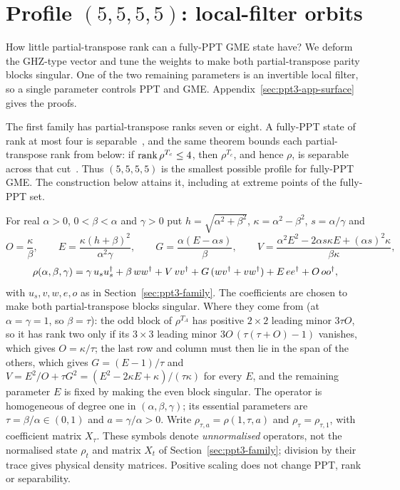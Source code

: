 \section{\texorpdfstring{Profile $(5,5,5,5)$}{Profile (5,5,5,5)}: local-filter orbits}\label{sec:ppt3-surface}

How little partial-transpose rank can a fully-PPT GME state have? We deform the GHZ-type vector and tune the weights to
make both partial-transpose parity blocks singular. One of the two remaining parameters is an invertible local filter,
so a single parameter controls PPT and GME. Appendix~\ref{sec:ppt3-app-surface} gives the proofs.

The first family has partial-transpose ranks seven or eight. A fully-PPT state of rank at most four is
separable~\cite{KCKL,HLVC,KL,ABLS}, and the same theorem bounds each partial-transpose rank from below: if $\operatorname{rank}\rho^{T_c}\le4$, then $\rho^{T_c}$, and hence $\rho$, is separable across that cut~\cite{KCKL,HLVC,KL}.
Thus $(5,5,5,5)$ is the smallest possible profile for fully-PPT GME. The construction below attains it, including at
extreme points of the fully-PPT set.

For real $\alpha>0$, $0<\beta<\alpha$ and $\gamma>0$ put
$h=\sqrt{\alpha^2+\beta^2}$, $\kappa=\alpha^2-\beta^2$, $s=\alpha/\gamma$ and
\begin{equation}\label{eq:ppt3-weights}
O=\frac \kappa\beta,\qquad E=\frac{\kappa(h+\beta)^2}{\alpha^2\gamma},\qquad G=\frac{\alpha(E-\alpha s)}\beta,\qquad
V=\frac{\alpha^2E^2-2\alpha s\kappa E+(\alpha s)^2\kappa}{\beta\kappa},
\end{equation}
\begin{equation}\label{eq:ppt3-rho-surface}
\rho(\alpha,\beta,\gamma)=\gamma\,u_su_s^{\dagger}+\beta\,ww^{\dagger}+V\,vv^{\dagger}+G\,(wv^{\dagger}+vw^{\dagger})+E\,ee^{\dagger}+O\,oo^{\dagger},
\end{equation}
with $u_s,v,w,e,o$ as in Section~\ref{sec:ppt3-family}. The coefficients are chosen
to make both partial-transpose blocks singular. Where they come from (at $\alpha=\gamma=1$, so $\beta=\tau$): the odd block of $\rho^{T_A}$ has positive
$2\times2$ leading minor $3\tau O$, so it has rank two only if its $3\times3$ leading minor $3O\,(\tau(\tau+O)-1)$ vanishes, which gives $O=\kappa/\tau$; the last
row and column must then lie in the span of the others, which gives $G=(E-1)/\tau$ and $V=E^2/O+\tau G^2=(E^2-2\kappa E+\kappa)/(\tau\kappa)$ for every $E$, and
the remaining parameter $E$ is fixed by making the even block singular. The
operator is homogeneous of degree one in $(\alpha,\beta,\gamma)$;
its essential parameters are $\tau=\beta/\alpha\in(0,1)$
and $a=\gamma/\alpha>0$. Write
$\rho_{\tau,a}=\rho(1,\tau,a)$ and
$\rho_\tau=\rho_{\tau,1}$, with coefficient matrix $X_\tau$. These symbols denote
\emph{unnormalised} operators, not the normalised state $\rho_t$ and matrix $X_t$ of Section~\ref{sec:ppt3-family}; division by their trace gives physical density matrices. Positive scaling
does not change PPT, rank or separability.

